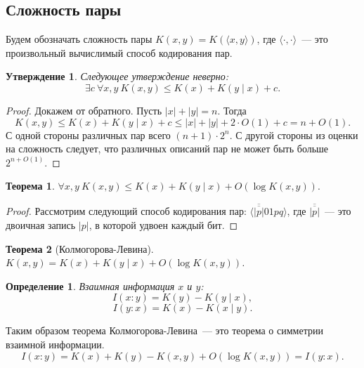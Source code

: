 \documentclass[12pt]{article}
\theoremstyle{definition}
\newtheorem{definition}{Определение}[section]
\theoremstyle{plain}
\newtheorem{theorem}{Теорема}[section]
\newtheorem{statement}{Утверждение}[section]
\theoremstyle{remark}
\begin{document}
\subsection{Сложность пары}
Будем обозначать сложность пары $K(x,y) = K(\langle x,y\rangle)$, где
$\langle\cdot,\cdot\rangle$~--- это произвольный вычислимый способ кодирования
пар.
\begin{statement}
    Следующее утверждение \emph{неверно}:
    \[
        \exists c\ \forall x,y\ K(x,y) \le K(x) + K(y\mid x) + c.
    \]
\end{statement}
\begin{proof}
    Докажем от обратного. Пусть $|x| + |y| = n$. Тогда 
    \[
    K(x,y)\le K(x) + K(y \mid x) + c \le |x| + |y| + 2\cdot O(1) + c = n + O(1).
    \]   
    С одной стороны различных пар всего $(n+1)\cdot 2^n$. С
    другой стороны из оценки на сложность следует, что различных описаний пар
    не может быть больше $2^{n + O(1)}$.
\end{proof}  
\begin{theorem}
    \(
        \forall x,y\ K(x,y) \le K(x) + K(y\mid x) + O(\log K(x,y)).
    \)
\end{theorem}
\begin{proof}
    Рассмотрим следующий способ кодирования пар: $\langle
    \overline{\overline{|p|}}01pq\rangle$, где $\overline{\overline{|p|}}$~--- это
    двоичная запись $|p|$, в которой удвоен каждый бит.
\end{proof}
\begin{theorem}[Колмогорова-Левина]\label{thm:kolmogorov-levin}
    $K(x,y) = K(x) + K(y\mid x) + O(\log K(x,y))$.
\end{theorem}
\begin{definition}
    \emph{Взаимная информация $x$ и $y$:}
    \[
        I(x:y) = K(y) - K(y\mid x),
    \]\[
        I(y:x) = K(x) - K(x\mid y).
    \]
\end{definition}
Таким образом теорема Колмогорова-Левина~--- это теорема о симметрии взаимной
информации.
    \[
        I(x:y) = K(x) + K(y) - K(x,y) + O(\log K(x,y)) =  I(y:x).
    \]
\end{document}
